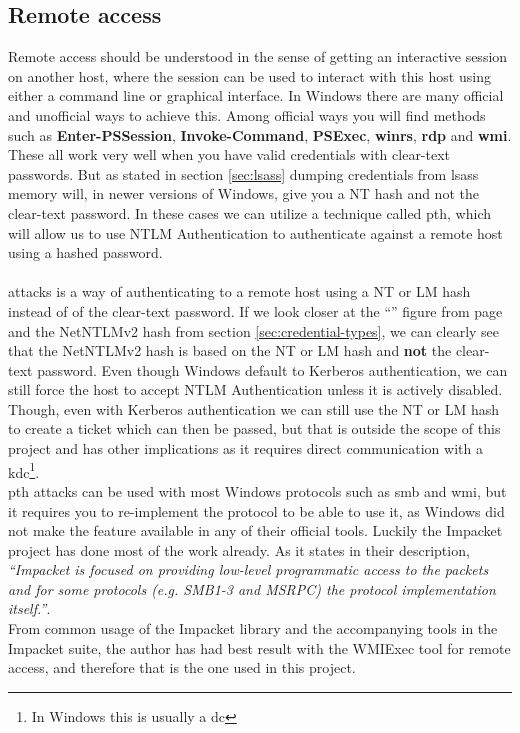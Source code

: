 \documentclass{article}
\begin{document}
\subsection{Remote access}
\label{sec:remote-access}
Remote access should be understood in the sense of getting an interactive session on another host, where the session can be used to interact with this host using either a command line or graphical interface. In Windows there are many official and unofficial ways to achieve this. Among official ways you will find methods such as \textbf{Enter-PSSession}, \textbf{Invoke-Command}, \textbf{PSExec}, \textbf{\gls{winrs}}, \textbf{\gls{rdp}} and \textbf{\gls{wmi}}. These all work very well when you have valid credentials with clear-text passwords. But as stated in section \ref{sec:lsass} dumping credentials from \gls{lsass} memory will, in newer versions of Windows, give you a NT hash and not the clear-text password. In these cases we can utilize a technique called \gls{pth}, which will allow us to use NTLM Authentication to authenticate against a remote host using a hashed password.
\paragraph{}
 attacks is a way of authenticating to a remote host using a NT or LM hash instead of of the clear-text password. If we look closer at the \enquote{} figure from page \pageref{fig:ntlm-authenticate-message} and the NetNTLMv2 hash from section \ref{sec:credential-types}, we can clearly see that the NetNTLMv2 hash is based on the NT or LM hash and \textbf{not} the clear-text password. Even though Windows default to Kerberos authentication, we can still force the host to accept NTLM Authentication unless it is actively disabled. Though, even with Kerberos authentication we can still use the NT or LM hash to create a ticket which can then be passed, but that is outside the scope of this project and has other implications as it requires direct communication with a \gls{kdc}\footnote{In Windows this is usually a \gls{dc}}.
\\
\gls{pth} attacks can be used with most Windows protocols such as \gls{smb} and \gls{wmi}, but it requires you to re-implement the protocol to be able to use it, as Windows did not make the feature available in any of their official tools. Luckily the Impacket project has done most of the work already. As it states in their description, \emph{\enquote{Impacket is focused on providing low-level programmatic access to the packets and for some protocols (e.g. SMB1-3 and MSRPC) the protocol implementation itself.}}\cite{url:impacket:github}.
\\
From common usage of the Impacket library and the accompanying tools in the Impacket suite, the author has had best result with the WMIExec tool for remote access, and therefore that is the one used in this project.
\end{document}
